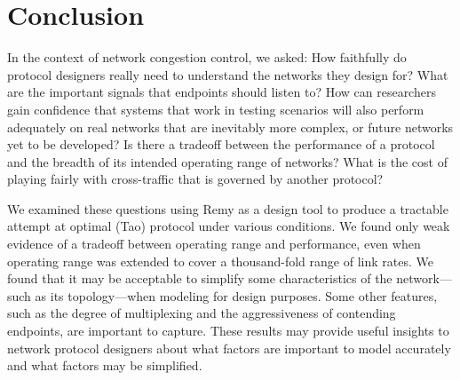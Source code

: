 \section{Conclusion}
\label{s:concl}

In the context of network congestion control, we asked: How faithfully
do protocol designers really need to understand the networks they
design for? What are the important signals that endpoints should
listen to?  How can researchers gain confidence that systems that work
in testing scenarios will also perform adequately on real networks
that are inevitably more complex, or future networks yet to be
developed? Is there a tradeoff between the performance of a protocol
and the breadth of its intended operating range of networks?  What is
the cost of playing fairly with cross-traffic that is governed by
another protocol?

We examined these questions using Remy as a design tool to produce a
tractable attempt at optimal (Tao) protocol under various
conditions. We found only weak evidence of a tradeoff between
operating range and performance, even when operating range was
extended to cover a thousand-fold range of link rates. We found that
it may be acceptable to simplify some characteristics of the
network---such as its topology---when modeling for design
purposes. Some other features, such as the degree of multiplexing and
the aggressiveness of contending endpoints, are important to
capture. These results may provide useful insights to network protocol
designers about what factors are important to model accurately and
what factors may be simplified.
